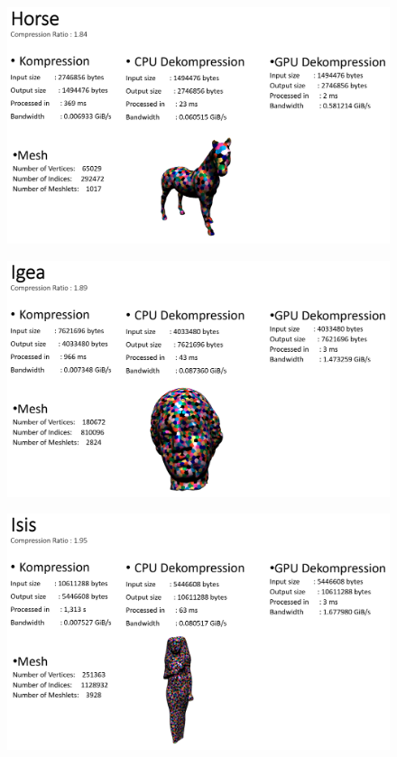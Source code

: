 \begin{figure}[h]
  \centering  
  \includegraphics[scale=0.28]{Bilder/ergebnisse_full/horse.png}
\end{figure}
\begin{figure}[h]
  \centering  
  \includegraphics[scale=0.28]{Bilder/ergebnisse_full/igea.png}
\end{figure}
\begin{figure}[h]
  \centering  
  \includegraphics[scale=0.28]{Bilder/ergebnisse_full/isis.png}
\end{figure}
